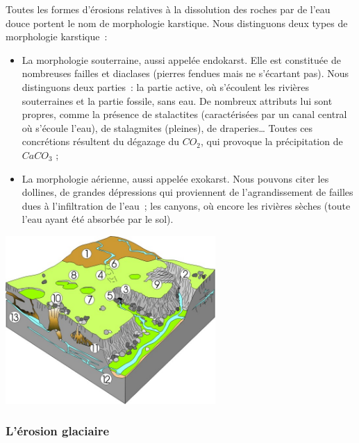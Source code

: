 \documentclass[a4paper,11pt]{article}
\begin{document}
Toutes les formes d'érosions relatives à la dissolution des roches par de l'eau douce portent le nom de morphologie karstique.
Nous distinguons deux types de morphologie karstique~:
\begin{itemize}
  \item La morphologie souterraine, aussi appelée endokarst.
  Elle est constituée de nombreuses failles et diaclases (pierres fendues mais ne s'écartant pas).
  Nous distinguons deux parties~: la partie active, où s'écoulent les rivières souterraines et la partie fossile, sans eau.
  De nombreux attributs lui sont propres, comme la présence de stalactites (caractérisées par un canal central où s'écoule l'eau), de stalagmites (pleines), de draperies\ldots
  Toutes ces concrétions résultent du dégazage du $CO_2$, qui provoque la précipitation de $CaCO_3$ ;

  \item La morphologie aérienne, aussi appelée exokarst.
  Nous pouvons citer les dollines, de grandes dépressions qui proviennent de l'agrandissement de failles dues à l'infiltration de l'eau~; les canyons, où encore les rivières sèches (toute l'eau ayant été absorbée par le sol).
\end{itemize}

\begin{center}
  \includegraphics[width=8cm]{Images/Erosion/karst_new_col.jpg}
\end{center}

\subsubsection{L'érosion glaciaire}
\end{document}

